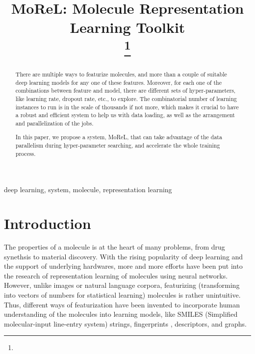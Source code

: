 \documentclass[conference]{IEEEtran}
\begin{document}
\title{MoReL: Molecule Representation Learning Toolkit\\
	{
		\footnotesize \textsuperscript{}
	}
		\thanks{}
}

\author{
}

\maketitle

\begin{abstract}
There are multiple ways to featurize molecules, and more than a couple of suitable deep learning models for any one of these features. 
Moreover, for each one of the combinations between feature and model, there are different sets of hyper-parameters, like learning rate, dropout rate, etc., to explore. 
The combinatorial number of learning instances to run is in the scale of thousands if not more, which makes it crucial to have a robust and efficient system to help us with data loading, as well as the arrangement and parallelization of the jobs. 

In this paper, we propose a system, MoReL, that can take advantage of the data parallelism during hyper-parameter searching, and accelerate the whole training process.
\end{abstract}

\begin{IEEEkeywords}
deep learning, system, molecule, representation learning
\end{IEEEkeywords}

\section{Introduction} \label{sec_intro} 

The properties of a molecule is at the heart of many problems, from drug synethsis to material discovery. 
With the rising popularity of deep learning and the support of underlying hardwares, more and more efforts have been put into the research of representation learning of molecules using neural networks. 
However, unlike images or natural language corpora, featurizing (transforming into vectors of numbers for statistical learning) molecules is rather unintuitive. 
Thus, different ways of featurization have been invented to incorporate human understanding of the molecules into learning models, like SMILES (Simplified molecular-input line-entry system) strings, fingerprints \cite{ecfp}, descriptors, and graphs. 
\end{document}

